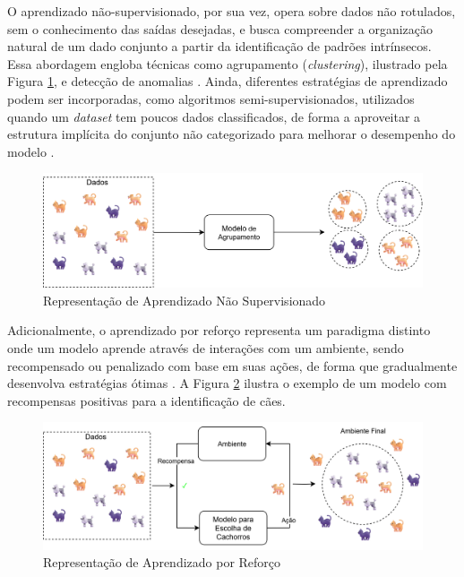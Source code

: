 O aprendizado não-supervisionado, por sua vez, opera sobre dados não rotulados, sem o conhecimento das saídas desejadas, e busca compreender a organização natural de um dado conjunto a partir da identificação de padrões intrínsecos. Essa abordagem engloba técnicas como agrupamento (\textit{clustering}), ilustrado pela Figura \ref{fig:mlunsupervised}, e detecção de anomalias \cite{mlSarker}. Ainda, diferentes estratégias de aprendizado podem ser incorporadas, como algoritmos semi-supervisionados, utilizados quando um \textit{dataset} tem poucos dados classificados, de forma a aproveitar a estrutura implícita do conjunto não categorizado para melhorar o desempenho do modelo \cite{mlSarker}.

\begin{figure}[H]
	\caption{\label{fig:mlunsupervised}Representação de Aprendizado Não Supervisionado}
    \begin{center}
    \includegraphics[width=1\linewidth]{images/mlunsupervised.png}
	\end{center}
\end{figure}

Adicionalmente, o aprendizado por reforço representa um paradigma distinto onde um modelo aprende através de interações com um ambiente, sendo recompensado ou penalizado com base em suas ações, de forma que gradualmente desenvolva estratégias ótimas \cite{mlSarker}. A Figura \ref{fig:mlreinforced} ilustra o exemplo de um modelo com recompensas positivas para a identificação de cães.

\begin{figure}[H]
	\caption{\label{fig:mlreinforced}Representação de Aprendizado por Reforço}
    \begin{center}
    \includegraphics[width=1\linewidth]{images/mlreinforced.png}
	\end{center}
\end{figure}

